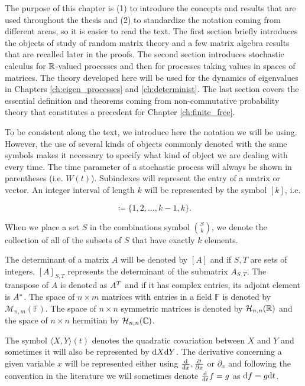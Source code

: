 The purpose of this chapter is (1) to introduce the concepts and results that are used throughout the thesis and (2) to standardize the notation coming from different areas, so it is easier to read the text. The first section briefly introduces the objects of study of random matrix theory and a few matrix algebra results that are recalled later in the proofs. The second section introduces stochastic calculus for $\mathbb R$-valued processes and then for processes taking values in spaces of matrices. The theory developed here will be used for the dynamics of eigenvalues in Chapters \ref{ch:eigen_processes} and \ref{ch:determinist}. The last section covers the essential definition and theorems coming from non-commutative probability theory that constitutes a precedent for Chapter \ref{ch:finite_free}.

To be consistent along the text, we introduce here the notation we will be using. However, the use of several kinds of objects commonly denoted with the same symbols makes it necessary to specify what kind of object we are dealing with every time. The time parameter of a stochastic process will always be shown in parentheses (i.e. $W(t)$). Subindexes will represent the entry of a matrix or vector. An integer interval of length $k$ will be represented by the symbol $[k]$, i.e.

\begin{equation*}
    [k] \coloneqq \{1,2,\dots, k-1, k\}.
\end{equation*}

When we place a set $S$ in the combinations symbol $\binom{S}{k}$, we denote the collection of all of the subsets of $S$ that have exactly $k$ elements. 

The determinant of a matrix $A$ will be denoted by $[A]$ and if $S,T$ are sets of integers, $[A]_{S,T}$ represents the determinant of the submatrix $A_{S,T}$. The transpose of $A$ is denoted as $A^T$ and if it has complex entries, its adjoint element is $A^*$. The space of $n\times m$ matrices with entries in a field $\mathbb F$ is denoted by $\mathcal M_{n,m}(\mathbb F)$. The space of $n\times n$ symmetric matrices is denoted by $\mathcal H_{n,n}(\mathbb R)$ and the space of $n\times n$ hermitian by $\mathcal H_{n,n}(\mathbb C)$.

The symbol $\langle X,Y \rangle(t)$ denotes the quadratic covariation between $X$ and $Y$ and sometimes it will also be represented by $\mathrm d X\mathrm d Y$. The derivative concerning a given variable $x$ will be represented either using $\frac{\mathrm d}{\mathrm d x}, \frac{\partial}{\partial x}$ or $\partial_x$ and following the convention in the literature we will sometimes denote $\frac{\mathrm d}{\mathrm d t} f = g$ as $\mathrm d f = g\mathrm d t$.


